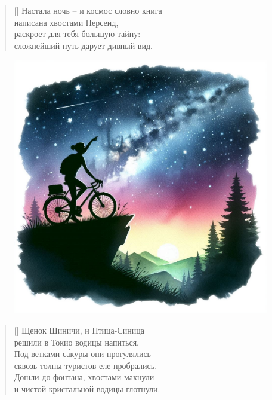 \documentclass[a5paper,11pt]{memoir}
\begin{document}
\clearpage

\begin{verse}[\versewidth]
Настала ночь -- и космос словно книга\\
написана хвостами Персеид,\\
раскроет для тебя большую тайну:\\
сложнейший путь дарует дивный вид.
\end{verse}

\begin{figure}[h]
	\vspace{-30pt}
	\hspace{-32pt}
	\includegraphics[width=\paperwidth]{images/cyclist-night.png}
\end{figure}







\PlainPoemTitle
{}
\settowidth{\versewidth}{ступеньки под весом скрипят и трещат ---}
\begin{verse}[\versewidth]
Щенок Шиничи, и Птица-Синица\\
решили в Токио водицы напиться.\\
Под ветками с\'{а}куры они прогулялись\\
сквозь толпы туристов еле пробрались.\\
Дошли до фонтана, хвостами махнули\\
и чистой кристальной водицы глотнули.\\
\end{verse}
\end{document}
